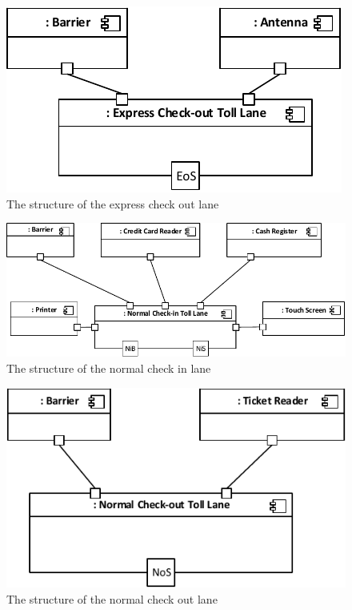\begin{figure}[H]
\centerline{\includegraphics[width=\textwidth]{img/composite_structure_diagram/cscd_toll_lane_express_out}}
\caption{The structure of the express check out lane}
\label{fig:csd_tleo}
\end{figure}

\begin{figure}[H]
\centerline{\includegraphics[width=\textwidth]{img/composite_structure_diagram/cscd_toll_lane_normal_in}}
\caption{The structure of the normal check in lane}
\label{fig:csd_tlni}
\end{figure}

\begin{figure}[H]
\centerline{\includegraphics[width=\textwidth]{img/composite_structure_diagram/cscd_toll_lane_normal_out}}
\caption{The structure of the normal check out lane}
\label{fig:csd_tlno}
\end{figure}


